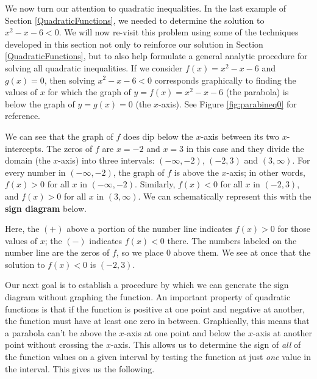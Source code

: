 \medskip


We now turn our attention to quadratic inequalities. In the last example of Section \ref{QuadraticFunctions}, we needed to determine the solution to $x^2 - x -6 < 0$.  We will now re-visit this problem using some of the techniques developed in this section not only to reinforce our solution in Section \ref{QuadraticFunctions}, but to also help formulate a general analytic procedure for solving all quadratic inequalities. If we consider $f(x) = x^2-x-6$ and $g(x)=0$, then solving $x^2 - x -6 < 0$ corresponds graphically to finding the values of $x$ for which the graph of $y=f(x)=x^2-x-6$ (the parabola) is below the graph of $y=g(x)=0$ (the $x$-axis). See Figure \ref{fig:parabineq0} for reference.


\label{firstsigndiagram}

We can see that the graph of $f$ does dip below the $x$-axis between its two $x$-intercepts.  The zeros of $f$ are $x=-2$ and $x=3$ in this case and they divide the domain (the $x$-axis) into three intervals:  $(-\infty, -2)$, $(-2,3)$ and $(3, \infty)$.  For every number in $(-\infty, -2)$, the graph of $f$ is above the $x$-axis; in other words, $f(x) > 0$ for all $x$ in $(-\infty, -2)$. Similarly, $f(x) < 0$ for all $x$ in $(-2,3)$, and $f(x) > 0$ for all $x$ in $(3, \infty)$.  We can schematically represent this with the {\bf sign diagram} below.

\begin{center}
\end{center}

Here, the $(+)$ above a portion of the number line indicates $f(x) > 0$ for those values of $x$; the $(-)$ indicates $f(x) < 0$ there.  The numbers labeled on the number line are the zeros of $f$, so we place $0$ above them.  We see at once that the solution to $f(x) < 0$ is $(-2,3)$.  

\smallskip

Our next goal is to establish a procedure by which we can generate the sign diagram without graphing the function.  An important property of quadratic functions is that if the function is positive at one point and negative at another, the function must have at least one zero in between.  Graphically, this means that a parabola can't be above the $x$-axis at one point and below the $x$-axis at another point without crossing the $x$-axis.  This allows us to determine the sign of \emph{all} of the function values on a given interval by testing the function at just \emph{one} value in the interval.  This gives us the following.

